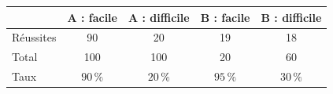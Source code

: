 \begingroup\renewcommand{\arraystretch}{1.35}
\begin{tabular}{@{}lcccc@{}}\toprule
 & A : facile & A : difficile & B : facile & B : difficile\\\midrule
Réussites & 90 & 20 & 19 & 18\\
Total & 100 & 100 & 20 & 60\\
Taux & $90\,\%$ & $20\,\%$ & $95\,\%$ & $30\,\%$\\
\bottomrule\end{tabular}\endgroup

\par\smallskip{}
